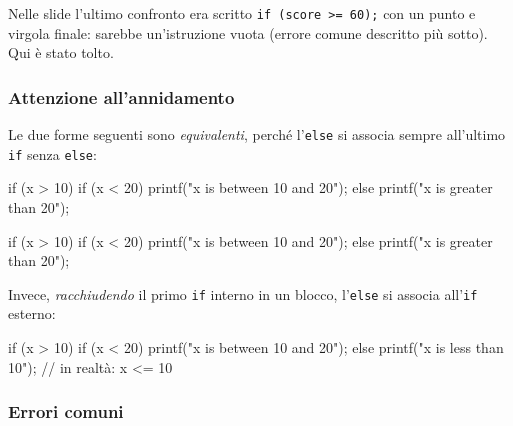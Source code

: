 \documentclass[11pt,a4paper]{article}
\begin{document}
\begin{osservazione}
Nelle slide l'ultimo confronto era scritto \lstinline|if (score >= 60);| con un punto e virgola finale: sarebbe un'istruzione vuota (errore comune descritto più sotto). Qui è stato tolto.
\end{osservazione}

\subsubsection{Attenzione all'annidamento}

Le due forme seguenti sono \emph{equivalenti}, perché l'\lstinline|else| si associa sempre all'ultimo \lstinline|if| senza \lstinline|else|:
\begin{codice}
if (x > 10) {
    if (x < 20)
        printf("x is between 10 and 20");
    else
        printf("x is greater than 20");
}
\end{codice}
\begin{codice}
if (x > 10)
    if (x < 20)
        printf("x is between 10 and 20");
    else
        printf("x is greater than 20");
\end{codice}
Invece, \emph{racchiudendo} il primo \lstinline|if| interno in un blocco, l'\lstinline|else| si associa all'\lstinline|if| esterno:
\begin{codice}
if (x > 10) {
    if (x < 20)
        printf("x is between 10 and 20");
}
else
    printf("x is less than 10");      // in realtà: x <= 10
\end{codice}

\subsubsection{Errori comuni}
\end{document}
